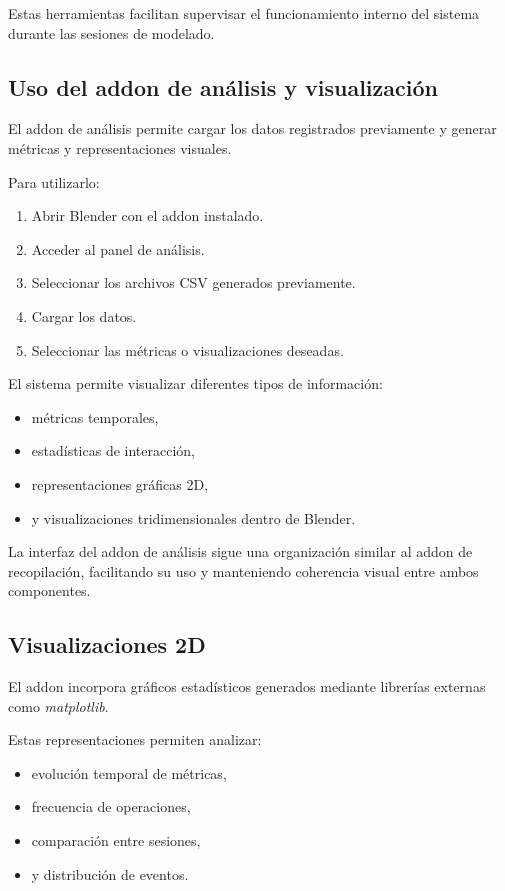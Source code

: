 Estas herramientas facilitan supervisar el funcionamiento interno del sistema durante las sesiones de modelado.

\subsection{Uso del addon de análisis y visualización}

El addon de análisis permite cargar los datos registrados previamente y generar métricas y representaciones visuales.

Para utilizarlo:

\begin{enumerate}
    \item Abrir Blender con el addon instalado.
    \item Acceder al panel de análisis.
    \item Seleccionar los archivos CSV generados previamente.
    \item Cargar los datos.
    \item Seleccionar las métricas o visualizaciones deseadas.
\end{enumerate}

El sistema permite visualizar diferentes tipos de información:

\begin{itemize}
    \item métricas temporales,
    \item estadísticas de interacción,
    \item representaciones gráficas 2D,
    \item y visualizaciones tridimensionales dentro de Blender.
\end{itemize}

La interfaz del addon de análisis sigue una organización similar al addon de recopilación, facilitando su uso y manteniendo coherencia visual entre ambos componentes.

\subsection{Visualizaciones 2D}

El addon incorpora gráficos estadísticos generados mediante librerías externas como \textit{matplotlib}.

Estas representaciones permiten analizar:

\begin{itemize}
    \item evolución temporal de métricas,
    \item frecuencia de operaciones,
    \item comparación entre sesiones,
    \item y distribución de eventos.
\end{itemize}

